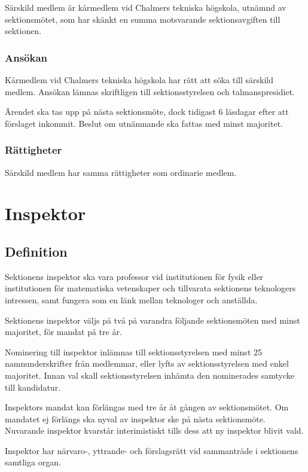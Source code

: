 \documentclass{styrdokument}
\begin{document}
\? Särskild medlem är kårmedlem vid Chalmers tekniska högskola, utnämnd av sektionsmötet, som har skänkt en summa motsvarande sektionsavgiften till sektionen.

\subsubsection{Ansökan}
\? Kårmedlem vid Chalmers tekniska högskola har rätt att söka till särskild medlem.
Ansökan lämnas skriftligen till sektionsstyrelsen och talmanspresidiet.

\? Ärendet ska tas upp på nästa sektionsmöte, dock tidigast 6 läsdagar efter att förslaget inkommit.
Beslut om utnämnande ska fattas med minst  majoritet.
\label{beslut.sarskildmedlem}

\subsubsection{Rättigheter}
\? Särskild medlem har samma rättigheter som ordinarie medlem.

\section{Inspektor}
\subsection{Definition}

\? Sektionens inspektor ska vara professor vid institutionen för fysik eller institutionen för matematiska vetenskaper och tillvarata sektionens teknologers intressen, samt fungera som en länk mellan teknologer och anställda.
	
\? Sektionens inspektor väljs på två på varandra följande sektionsmöten med minst  majoritet, för mandat på tre år.
\label{beslut.inspektor}
	
\? Nominering till inspektor inlämnas till sektionsstyrelsen med minst 25 namnunderskrifter från medlemmar, eller lyfts av sektionsstyrelsen med enkel majoritet.
Innan val skall sektionsstyrelsen inhämta den nominerades samtycke till kandidatur.

\? Inspektors mandat kan förlängas med tre år åt gången av sektionsmötet.
Om mandatet ej förlängs ska nyval av inspektor ske på nästa sektionsmöte.
Nuvarande inspektor kvarstår interimistiskt tills dess att ny inspektor blivit vald.

\? Inspektor har närvaro-, yttrande- och förslagsrätt vid sammanträde i sektionens samtliga organ.
\end{document}
